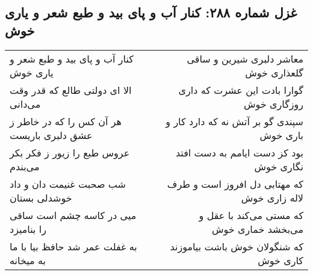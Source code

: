 \begin{center}
\section*{غزل شماره ۲۸۸: کنار آب و پای بید و طبع شعر و یاری خوش}
\label{sec:sh288}
\begin{longtable}{l p{0.5cm} r}
کنار آب و پای بید و طبع شعر و یاری خوش
&&
معاشر دلبری شیرین و ساقی گلعذاری خوش
\\
الا ای دولتی طالع که قدر وقت می‌دانی
&&
گوارا بادت این عشرت که داری روزگاری خوش
\\
هر آن کس را که در خاطر ز عشق دلبری باریست
&&
سپندی گو بر آتش نه که دارد کار و باری خوش
\\
عروس طبع را زیور ز فکر بکر می‌بندم
&&
بود کز دست ایامم به دست افتد نگاری خوش
\\
شب صحبت غنیمت دان و داد خوشدلی بستان
&&
که مهتابی دل افروز است و طرف لاله زاری خوش
\\
میی در کاسه چشم است ساقی را بنامیزد
&&
که مستی می‌کند با عقل و می‌بخشد خماری خوش
\\
به غفلت عمر شد حافظ بیا با ما به میخانه
&&
که شنگولان خوش باشت بیاموزند کاری خوش
\\
\end{longtable}
\end{center}
